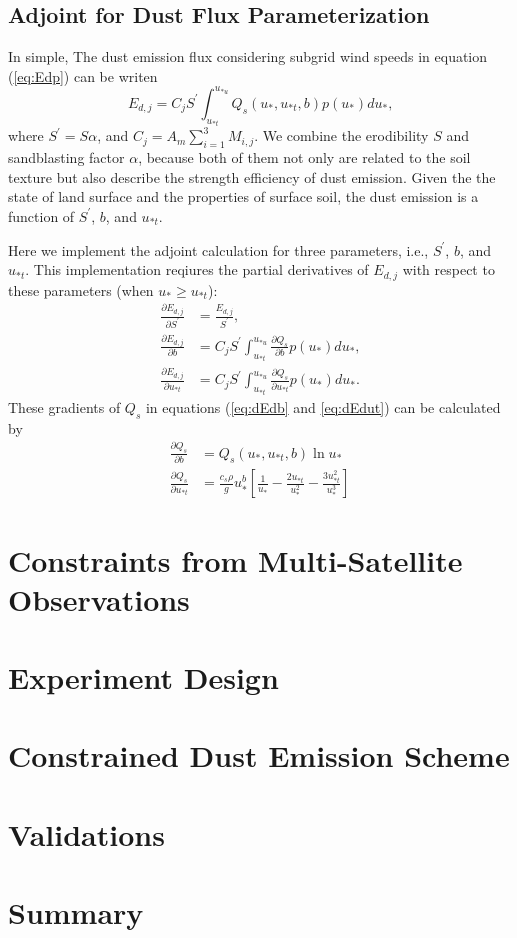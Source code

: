  \subsection{Adjoint for Dust Flux Parameterization}

   In simple, The dust emission flux considering subgrid wind speeds in equation
   (\ref{eq:Edp}) can be writen
   \begin{equation}
   E_{d,j} = C_j S^\prime \int^{u_{*u}}_{u_{*t}} Q_s(u_*,u_{*t},b) p(u_*) d u_* \mbox{,}
   \end{equation}
   where $S^\prime = S \alpha$, and $C_j=A_m \displaystyle \sum_{i=1}^3 M_{i,j}$. We combine
   the erodibility $S$ and sandblasting factor $\alpha$, because both of them not only are
   related to the soil texture but also describe the strength efficiency of dust emission.
   Given the the state of land surface and the properties of surface soil, the dust emission
   is a function of $S^\prime$, $b$, and $u_{*t}$.

   Here we implement the adjoint calculation for three parameters, i.e.,
   $S^\prime$, $b$, and $u_{*t}$. This implementation reqiures the partial
   derivatives of $E_{d,j}$ with respect to these parameters (when
   $u_* \geq u_{*t}$):
   \begingroup
   \allowdisplaybreaks
   \begin{align}
     \frac{\partial E_{d,j}}{\partial S^\prime} 
       &= \frac{E_{d,j}}{S^\prime}\mbox{,} \\
     \frac{\partial E_{d,j}}{\partial b} 
       &= C_j S^\prime \int^{u_{*u}}_{u_{*t}} 
          \frac{\partial Q_s}{\partial b} p(u_*) d u_* \mbox{,} \label{eq:dEdb}\\
     \frac{\partial E_{d,j}}{\partial u_{*t}}
       & = C_j S^\prime \int^{u_{*u}}_{u_{*t}} 
          \frac{\partial Q_s}{\partial u_{*t}} p(u_*) d u_* \mbox{.} \label{eq:dEdut}
   \end{align}
   \endgroup
   These gradients of $Q_s$ in equations (\ref{eq:dEdb} and \ref{eq:dEdut}) can be
   calculated by
   \begingroup
   \allowdisplaybreaks
   \begin{align}
   \frac{\partial Q_s}{\partial b} &= Q_s(u_*,u_{*t},b) \ln{u_*} \\
   \frac{\partial Q_s}{\partial u_{*t}} &=\frac{c_s \rho}{g} u_*^b
         \left[\frac{1}{u_*} - \frac{2u_{*t}}{u_*^2} 
         - \frac{3u_{*t}^2}{u_*^3}\right] 
   \end{align}
   \endgroup

\section{Constraints from Multi-Satellite Observations}

\section{Experiment Design}

\section{Constrained Dust Emission Scheme}

\section{Validations}

\section{Summary}
